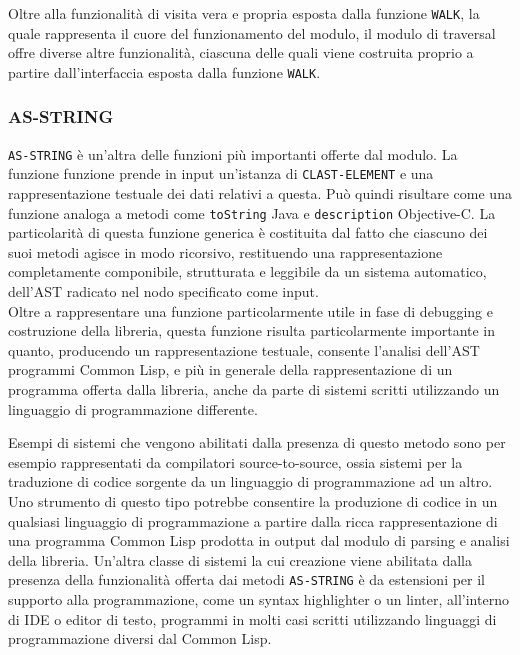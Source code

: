 Oltre alla funzionalità di visita vera e propria esposta dalla funzione
\texttt{WALK}, la quale rappresenta il cuore del funzionamento del modulo, il
modulo di traversal offre diverse altre funzionalità, ciascuna delle quali viene
costruita proprio a partire dall'interfaccia esposta dalla funzione
\texttt{WALK}.

\subsubsection{AS-STRING}

\texttt{AS-STRING} è un'altra delle funzioni più importanti offerte dal modulo.
La funzione funzione prende in input un'istanza di \texttt{CLAST-ELEMENT} e una
rappresentazione testuale dei dati relativi a questa. Può quindi risultare come
una funzione analoga a metodi come \texttt{toString} Java e \texttt{description}
Objective-C. La particolarità di questa funzione generica è costituita dal fatto
che ciascuno dei suoi metodi agisce in modo ricorsivo, restituendo una
rappresentazione completamente componibile, strutturata e leggibile da un
sistema automatico, dell'AST radicato nel nodo specificato come input.\\

Oltre a rappresentare una funzione particolarmente utile in fase di debugging e
costruzione della libreria, questa funzione risulta particolarmente importante
in quanto, producendo un rappresentazione testuale, consente l'analisi dell'AST
programmi Common Lisp, e più in generale della rappresentazione di un programma
offerta dalla libreria, anche da parte di sistemi scritti utilizzando un
linguaggio di programmazione differente.

Esempi di sistemi che vengono abilitati dalla presenza di questo metodo sono per
esempio rappresentati da compilatori source-to-source, ossia sistemi per la
traduzione di codice sorgente da un linguaggio di programmazione ad un altro.
Uno strumento di questo tipo potrebbe consentire la produzione di codice in un
qualsiasi linguaggio di programmazione a partire dalla ricca rappresentazione di
una programma Common Lisp prodotta in output dal modulo di parsing e analisi
della libreria. Un'altra classe di sistemi la cui creazione viene abilitata
dalla presenza della funzionalità offerta dai metodi \texttt{AS-STRING} è da
estensioni per il supporto alla programmazione, come un syntax highlighter o un
linter, all'interno di IDE o editor di testo, programmi in molti casi scritti
utilizzando linguaggi di programmazione diversi dal Common Lisp.
